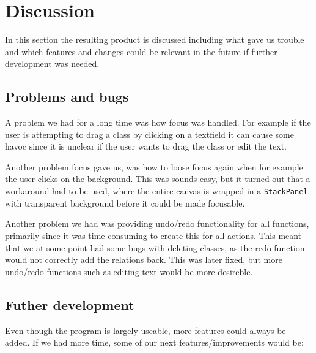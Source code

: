 \section{Discussion}
In this section the resulting product is discussed including what gave us trouble and
which features and changes could be relevant in the future if further
development was needed.

\subsection{Problems and bugs}
A problem we had for a long time was how focus was handled. For example if the
user is attempting to drag a class by clicking on a textfield it can cause some
havoc since it is unclear if the user wants to drag the class or edit the text. 

Another problem focus gave us, was how to loose focus again when for example the
user clicks on the background. This was sounds easy, but it turned out that a
workaround had to be used, where the entire canvas is wrapped in a
\texttt{StackPanel} with transparent background before it could be made
focusable.

Another problem we had was providing undo/redo functionality for all functions,
primarily since it was time consuming to create this for all actions. This meant
that we at some point had some bugs with deleting classes, as the redo function
would not correctly add the relations back. This was later fixed, but more
undo/redo functions such as editing text would be more desireble. 

\subsection{Futher development}
Even though the program is largely useable, more features could always be added.
If we had more time, some of our next features/improvements would be:

